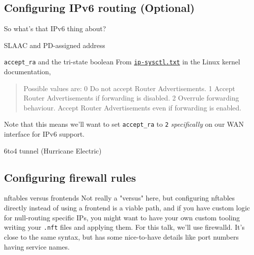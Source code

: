 \documentclass[bigger]{beamer}
\begin{document}
\subsection{Configuring IPv6 routing (Optional)}
\label{sec:orgab512e8}
\begin{frame}
  So what's that IPv6 thing about?
\end{frame}

\begin{frame}[fragile,label={sec:orgf2a58cf}]{SLAAC and PD-assigned address}
 \begin{block}{\texttt{accept\_ra} and the tri-state boolean}
From \href{https://www.kernel.org/doc/Documentation/networking/ip-sysctl.txt}{\texttt{ip-sysctl.txt}} in the Linux kernel documentation,
\begin{quote}
Possible values are:
    0 Do not accept Router Advertisements.
    1 Accept Router Advertisements if forwarding is disabled.
    2 Overrule forwarding behaviour. Accept Router Advertisements
      even if forwarding is enabled.
\end{quote}

Note that this means we'll want to set \texttt{accept\_ra} to \texttt{2} \emph{specifically} on our
WAN interface for IPv6 support.
\end{block}
\end{frame}

\begin{frame}[label={sec:orga4304bc}]{6to4 tunnel (Hurricane Electric)}
\end{frame}

\subsection{Configuring firewall rules}
\label{sec:org19a3785}

\begin{frame}[fragile,label={sec:org1530f3c}]{nftables versus frontends}
 Not really a "versus" here, but configuring nftables directly instead of using a
frontend is a viable path, and if you have custom logic for null-routing
specific IPs, you might want to have your own custom tooling writing your \texttt{.nft}
files and applying them. For this talk, we'll use firewalld. It's close to the
same syntax, but has some nice-to-have details like port numbers having service
names.
\end{frame}
\end{document}
